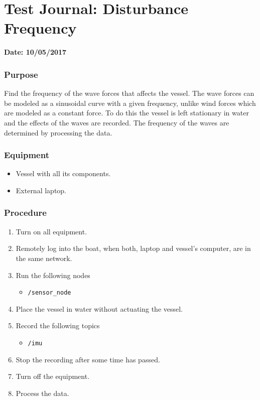 \chapter{Test Journal: Disturbance Frequency} \label{app:Disturbance}

\textbf{Date: 10/05/2017}

\subsection*{Purpose}
Find the frequency of the wave forces that affects the vessel. The wave forces can be modeled as a sinusoidal curve with a given frequency, unlike wind forces which are modeled as a constant force. To do this the vessel is left stationary in water and the effects of the waves are recorded. The frequency of the waves are determined by processing the data.

\subsection*{Equipment}
\begin{itemize}
    \item Vessel with all its components. 
    \item External laptop.
\end{itemize}

\subsection*{Procedure}
\begin{enumerate}
    \item Turn on all equipment.
    \item Remotely log into the boat, when both, laptop and vessel's computer, are in the same network.
    \item Run the following nodes
    \begin{itemize}
        \item \lstinline[style=cinline]{/sensor_node}
    \end{itemize}
    \item Place the vessel in water without actuating the vessel.
    \item Record the following topics
    \begin{itemize}
        \item \lstinline[style=cinline]{/imu}      
    \end{itemize}
    \item Stop the recording after some time has passed.
    \item Turn off the equipment.
    \item Process the data.
\end{enumerate}

